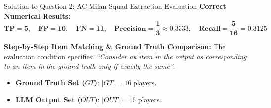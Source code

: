 \documentclass[11pt,a4paper]{article}
\begin{document}
\begin{solutionbox}{Solution to Question 2: AC Milan Squad Extraction Evaluation}
\textbf{Correct Numerical Results:}
\begin{equation*}
    \mathbf{TP = 5}, \quad \mathbf{FP = 10}, \quad \mathbf{FN = 11}, \quad \mathbf{\text{Precision} = \frac{1}{3} \approx 0.3333}, \quad \mathbf{\text{Recall} = \frac{5}{16} = 0.3125}
\end{equation*}

\medskip
\noindent
\textbf{Step-by-Step Item Matching \& Ground Truth Comparison:}
The evaluation condition specifies: \textit{``Consider an item in the output as corresponding to an item in the ground truth only if exactly the same''}.
\begin{itemize}[leftmargin=1.5em]
    \item \textbf{Ground Truth Set ($GT$)}: $|GT| = 16$ players.
    \item \textbf{LLM Output Set ($OUT$)}: $|OUT| = 15$ players.
\end{itemize}


\end{solutionbox}
\end{document}
